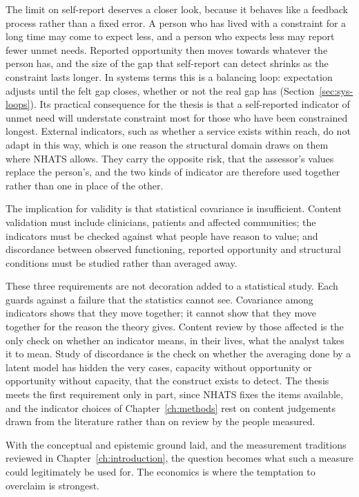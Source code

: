The limit on self-report deserves a closer look, because it behaves like a
feedback process rather than a fixed error. A person who has lived with a
constraint for a long time may come to expect less, and a person who expects
less may report fewer unmet needs. Reported opportunity then moves towards
whatever the person has, and the size of the gap that self-report can detect
shrinks as the constraint lasts longer. In systems terms this is a balancing
loop: expectation adjusts until the felt gap closes, whether or not the real
gap has (Section~\ref{sec:sys-loops}). Its practical consequence for the
thesis is that a self-reported indicator of unmet need will understate
constraint most for those who have been constrained longest. External
indicators, such as whether a service exists within reach, do not adapt in
this way, which is one reason the structural domain draws on them where NHATS
allows. They carry the opposite risk, that the assessor's values replace the
person's, and the two kinds of indicator are therefore used together rather
than one in place of the other.

The implication for validity is that statistical covariance is insufficient.
Content validation must include clinicians, patients and affected communities;
the indicators must be checked against what people have reason to value; and
discordance between observed functioning, reported opportunity and structural
conditions must be studied rather than averaged away.

These three requirements are not decoration added to a statistical study.
Each guards against a failure that the statistics cannot see. Covariance among
indicators shows that they move together; it cannot show that they move
together for the reason the theory gives. Content review by those affected is
the only check on whether an indicator means, in their lives, what the analyst
takes it to mean. Study of discordance is the check on whether the averaging
done by a latent model has hidden the very cases, capacity without opportunity
or opportunity without capacity, that the construct exists to detect. The
thesis meets the first requirement only in part, since NHATS fixes the items
available, and the indicator choices of Chapter~\ref{ch:methods} rest on
content judgements drawn from the literature rather than on review by the
people measured.

With the conceptual and epistemic ground laid, and the measurement traditions
reviewed in Chapter~\ref{ch:introduction}, the question becomes what such a
measure could legitimately be used for. The economics is where the temptation
to overclaim is strongest.

